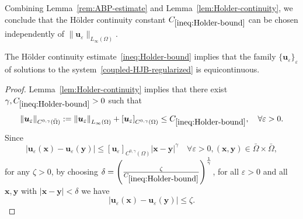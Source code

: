 \documentclass[final,onefignum,onetabnum]{mousaviart}
\begin{document}
	\begin{remark}
		\label{ineq:Holder-bound-inpendent-u}
		Combining Lemma~\ref{rem:ABP-estimate} and Lemma~\ref{lem:Holder-continuity}, we conclude that the Hölder continuity constant $C_{\ref{ineq:Holder-bound}}$ can be chosen independently of $\| \boldsymbol{u}_{\varepsilon} \|_{L_{\infty}(\Omega)}$. %
	\end{remark}
	\begin{remark}[equicontinuity]
		\label{rem:equicontinuouity-regularized-solution}
		The Hölder continuity estimate~\eqref{ineq:Holder-bound} implies that the family $\{\boldsymbol{u}_{\varepsilon}\}_{\varepsilon}$ of solutions to the system~\eqref{coupled-HJB-regularized} is equicontinuous.
	\end{remark}
	\begin{proof}
		Lemma~\ref{lem:Holder-continuity} implies that there exist $\gamma, C_{\ref{ineq:Holder-bound}}>0$ such that
		\begin{equation}
			\label{ineq:Holder-continuiuty}
			\left\| \boldsymbol{u}_{\varepsilon} \right\|_{C^{0, \gamma}(\bar{\Omega})}
			:=
			\left\| \boldsymbol{u}_{\varepsilon} \right\|_{L_\infty(\Omega)} 
			+
			\left[ \boldsymbol{u}_{\varepsilon} \right]_{C^{0,\gamma}(\Omega)}
			\leq
			C_{\ref{ineq:Holder-bound}},
			\quad
			\forall \varepsilon > 0.
		\end{equation}
		Since
		\begin{equation}
			\label{ineq:equicontinuouity}
			\left| \boldsymbol{u}_{\varepsilon}(\boldsymbol{x}) 
			- 
			\boldsymbol{u}_{\varepsilon}(\boldsymbol{y}) \right|
			\leq
			\left[ \boldsymbol{u}_{\varepsilon} \right]_{C^{0,\gamma}(\Omega)}
			\left| \boldsymbol{x} - \boldsymbol{y} \right|^{\gamma} 
			\quad
			\forall
			\varepsilon > 0, (\boldsymbol{x}, \boldsymbol{y}) \in \bar{\Omega} \times \bar{\Omega},  
		\end{equation}
		for any $\zeta>0$, by choosing $\delta = \left( \frac{\zeta}{C_{\ref{ineq:Holder-bound}}} \right)^{\frac{1}{\gamma}} $, for all $\varepsilon > 0$ and all $\boldsymbol{x}, \boldsymbol{y}$ with $\left| \boldsymbol{x} - \boldsymbol{y} \right| < \delta$ we have
		\begin{equation}
			\left| \boldsymbol{u}_{\varepsilon}(\boldsymbol{x}) - \boldsymbol{u}_{\varepsilon}(\boldsymbol{y}) \right|
			\leq
			\zeta.
		\end{equation}
	\end{proof}
	
\end{document}

